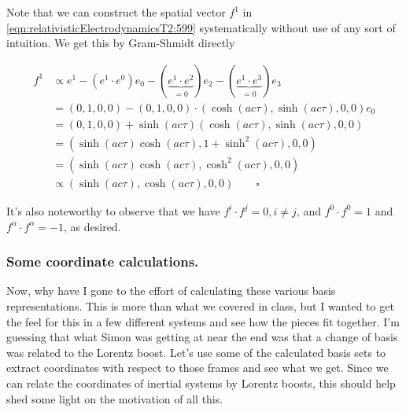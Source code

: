 Note that we can construct the spatial vector $f^1$ in \ref{eqn:relativisticElectrodynamicsT2:599} systematically without use of any sort of intuition.  We get this by Gram-Shmidt directly

\begin{align*}
f^1 
&\propto e^1 - (e^1 \cdot e^0) e_0 - (\underbrace{e^1 \cdot e^2}_{=0}) e_2 - (\underbrace{e^1 \cdot e^3}_{=0}) e_3 \\
&= (0, 1, 0, 0) - (0, 1, 0, 0) \cdot ( \cosh(ac\tau), \sinh(ac\tau), 0, 0) e_0 \\
&= (0, 1, 0, 0) + \sinh(ac\tau) ( \cosh(ac\tau), \sinh(ac\tau), 0, 0) \\
&= (\sinh(ac\tau) \cosh(ac\tau), 1 + \sinh^2(ac\tau), 0, 0 ) \\
&= (\sinh(ac\tau) \cosh(ac\tau), \cosh^2(ac\tau), 0, 0 ) \\
&\propto (\sinh(ac\tau), \cosh(ac\tau), 0, 0 ) \qquad \square
\end{align*}

It's also noteworthy to observe that we have $f^i \cdot f^j = 0, i \ne j$, and $f^0 \cdot f^0 = 1$ and $f^\alpha \cdot f^\alpha = -1$, as desired.

\subsubsection{Some coordinate calculations.}

Now, why have I gone to the effort of calculating these various basis representations.  This is more than what we covered in class, but I wanted to get the feel for this in a few different systems and see how the pieces fit together.  I'm guessing that what Simon was getting at near the end was that a change of basis was related to the Lorentz boost.  Let's use some of the calculated basis sets to extract coordinates with respect to those frames and see what we get.  Since we can relate the coordinates of inertial systems by Lorentz boosts, this should help shed some light on the motivation of all this.

